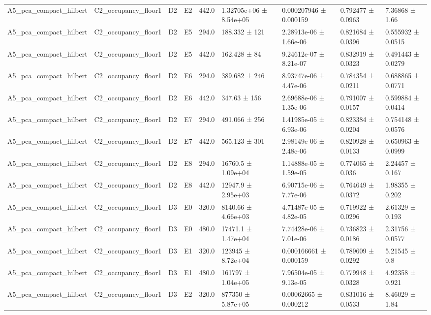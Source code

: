 \begin{table}
\begin{tabular}{lllllllll}
A5\_pca\_compact\_hilbert & C2\_occupancy\_floor1 & D2 & E2 & 442.0 & 1.32705e+06 ± 8.54e+05 & 0.000207946 ± 0.000159 & 0.792477 ± 0.0963 & 7.36868 ± 1.66 \\
A5\_pca\_compact\_hilbert & C2\_occupancy\_floor1 & D2 & E5 & 294.0 & 188.332 ± 121 & 2.28913e-06 ± 1.66e-06 & 0.821684 ± 0.0396 & 0.555932 ± 0.0515 \\
A5\_pca\_compact\_hilbert & C2\_occupancy\_floor1 & D2 & E5 & 442.0 & 162.428 ± 84 & 9.24612e-07 ± 8.21e-07 & 0.832919 ± 0.0323 & 0.491443 ± 0.0279 \\
A5\_pca\_compact\_hilbert & C2\_occupancy\_floor1 & D2 & E6 & 294.0 & 389.682 ± 246 & 8.93747e-06 ± 4.47e-06 & 0.784354 ± 0.0211 & 0.688865 ± 0.0771 \\
A5\_pca\_compact\_hilbert & C2\_occupancy\_floor1 & D2 & E6 & 442.0 & 347.63 ± 156 & 2.69688e-06 ± 1.35e-06 & 0.791007 ± 0.0157 & 0.599884 ± 0.0414 \\
A5\_pca\_compact\_hilbert & C2\_occupancy\_floor1 & D2 & E7 & 294.0 & 491.066 ± 256 & 1.41985e-05 ± 6.93e-06 & 0.823384 ± 0.0204 & 0.754148 ± 0.0576 \\
A5\_pca\_compact\_hilbert & C2\_occupancy\_floor1 & D2 & E7 & 442.0 & 565.123 ± 301 & 2.98149e-06 ± 2.48e-06 & 0.820928 ± 0.0133 & 0.650963 ± 0.0999 \\
A5\_pca\_compact\_hilbert & C2\_occupancy\_floor1 & D2 & E8 & 294.0 & 16760.5 ± 1.09e+04 & 1.14888e-05 ± 1.59e-05 & 0.774065 ± 0.036 & 2.24457 ± 0.167 \\
A5\_pca\_compact\_hilbert & C2\_occupancy\_floor1 & D2 & E8 & 442.0 & 12947.9 ± 2.95e+03 & 6.90715e-06 ± 7.77e-06 & 0.764649 ± 0.0372 & 1.98355 ± 0.202 \\
A5\_pca\_compact\_hilbert & C2\_occupancy\_floor1 & D3 & E0 & 320.0 & 8140.66 ± 4.66e+03 & 4.71487e-05 ± 4.82e-05 & 0.719922 ± 0.0296 & 2.61329 ± 0.193 \\
A5\_pca\_compact\_hilbert & C2\_occupancy\_floor1 & D3 & E0 & 480.0 & 17471.1 ± 1.47e+04 & 7.74428e-06 ± 7.01e-06 & 0.736823 ± 0.0186 & 2.31756 ± 0.0577 \\
A5\_pca\_compact\_hilbert & C2\_occupancy\_floor1 & D3 & E1 & 320.0 & 123945 ± 8.72e+04 & 0.000166661 ± 0.000159 & 0.789609 ± 0.0292 & 5.21545 ± 0.8 \\
A5\_pca\_compact\_hilbert & C2\_occupancy\_floor1 & D3 & E1 & 480.0 & 161797 ± 1.04e+05 & 7.96504e-05 ± 9.13e-05 & 0.779948 ± 0.0328 & 4.92358 ± 0.921 \\
A5\_pca\_compact\_hilbert & C2\_occupancy\_floor1 & D3 & E2 & 320.0 & 877350 ± 5.87e+05 & 0.00062665 ± 0.000212 & 0.831016 ± 0.0533 & 8.46029 ± 1.84 \\

\end{tabular}
\end{table}

